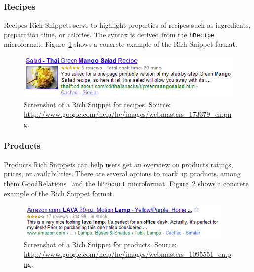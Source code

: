 \documentclass[12pt]{article}
\begin{document}
\subsubsection{Recipes}
Recipes Rich Snippets serve to highlight properties of recipes such as ingredients, preparation time, or calories. The syntax is derived from the \texttt{hRecipe} microformat. Figure~\ref{fig:rich-snippets-recipes} shows a concrete example of the Rich Snippet format.
\begin{figure}[htbp!]
\begin{center}
  \includegraphics[width=0.75\linewidth]{./resources/rich-snippets-recipes.png}
    \caption[Screenshot of a Rich Snippet for recipes.]{Screenshot of a Rich Snippet for recipes. Source: \url{http://www.google.com/help/hc/images/webmasters_173379_en.png}.}
  \label{fig:rich-snippets-recipes}
  \end{center}  
\end{figure}

\subsubsection{Products}
Products Rich Snippets can help users get an overview on products ratings, prices, or availabilities. There are several options to mark up products, among them GoodRelations~\cite{Hepp:GoodRelations} and the \texttt{hProduct} microformat. Figure~\ref{fig:rich-snippets-products} shows a concrete example of the Rich Snippet format.
\begin{figure}[htbp!]
\begin{center}
  \includegraphics[width=0.75\linewidth]{./resources/rich-snippets-products.png}
    \caption[Screenshot of a Rich Snippet for products.]{Screenshot of a Rich Snippet for products. Source: \url{http://www.google.com/help/hc/images/webmasters_1095551_en.png}.}
  \label{fig:rich-snippets-products}
  \end{center}  
\end{figure}
\end{document}
